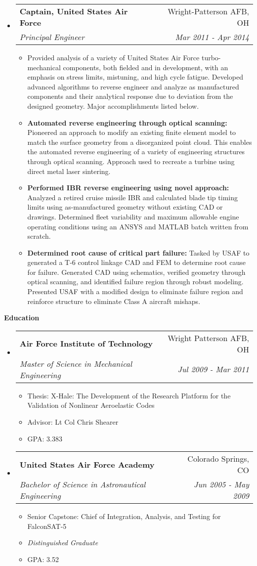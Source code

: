 \documentclass[letterpaper,11pt]{article}
\makeatletter
\newcommand{\resitem}[1]{\item #1 \vspace{-2pt}}
\newcommand{\resheading}[1]{{\large \colorbox{mygrey}{\begin{minipage}{\textwidth}{\textbf{#1 \vphantom{p\^{E}}}}\end{minipage}}}}
\newcommand{\ressubheading}[4]{
\begin{tabular*}{7.0in}{l@{\extracolsep{\fill}}r}
		\textbf{#1} & #2 \\
		\textit{#3} & \textit{#4} \\
\end{tabular*}\vspace{-6pt}}
\makeatother
\begin{document}
\begin{itemize}
\item
  \ressubheading{Captain, United States Air Force}{Wright-Patterson AFB, OH}{Principal Engineer}{Mar 2011 - Apr 2014}
  \begin{itemize}
    \resitem{Provided analysis of a variety of United States Air Force turbo-mechanical components, both fielded and in development, with an emphasis on stress limits, mistuning, and high cycle fatigue. Developed advanced algorithms to reverse engineer and analyze as manufactured components and their analytical response due to deviation from the designed geometry. Major accomplishments listed below.}
    \resitem{\textbf{Automated reverse engineering through optical scanning:}  Pioneered an approach to modify an existing finite element model to match the surface geometry from a disorganized point cloud. This enables the automated reverse engineering	of a variety of engineering structures through optical scanning. Approach used to recreate a turbine using direct metal laser sintering.}
    \resitem{\textbf{Performed IBR reverse engineering using novel approach:}  Analyzed a retired cruise missile IBR and calculated blade tip timing limits using as-manufactured geometry without existing CAD or drawings. Determined fleet variability and maximum allowable engine operating conditions using an ANSYS and MATLAB batch written from scratch.}
    \resitem{\textbf{Determined root cause of critical part failure:} Tasked by USAF to generated a T-6 control linkage CAD and FEM to determine root cause for failure. Generated CAD using schematics, verified geometry through optical scanning, and identified failure region through robust modeling. Presented USAF with a modified design to eliminate failure region and reinforce structure to eliminate Class A aircraft mishaps.}
  \end{itemize}

\end{itemize}


\resheading{Education}
\begin{itemize}
\item
  \ressubheading{Air Force Institute of Technology}{Wright Patterson AFB, OH}{Master of Science in Mechanical Engineering}{Jul 2009 - Mar 2011}
  \begin{itemize}
    \resitem{Thesis: X-Hale: The Development of the Research Platform for the Validation of Nonlinear Aeroelastic Codes}
    \resitem{Advisor: Lt Col Chris Shearer}
    \resitem{GPA: 3.383}
  \end{itemize}

\item
  \ressubheading{United States Air Force Academy}{Colorado Springs, CO}{Bachelor of Science in Astronautical Engineering}{Jun 2005 - May 2009}
  \begin{itemize}
    \resitem{Senior Capstone: Chief of Integration, Analysis, and Testing for FalconSAT-5}
    \resitem{\emph{Distinguished Graduate}}
    \resitem{GPA: 3.52}
  \end{itemize}

\end{itemize}
\end{document}
